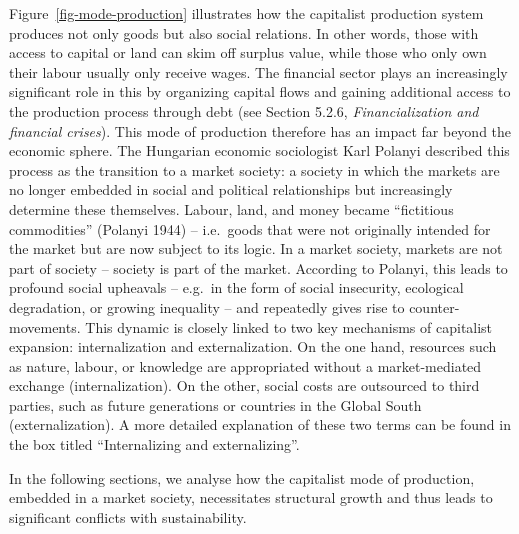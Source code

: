 \documentclass[
  a4paper,
  DIV=11,
  numbers=noendperiod,
  oneside,
  openany]{scrreprt}
\begin{document}
Figure~\ref{fig-mode-production} illustrates how the capitalist
production system produces not only goods but also social relations. In
other words, those with access to capital or land can skim off surplus
value, while those who only own their labour usually only receive wages.
The financial sector plays an increasingly significant role in this by
organizing capital flows and gaining additional access to the production
process through debt (see Section 5.2.6, \emph{Financialization and
financial crises}). This mode of production therefore has an impact far
beyond the economic sphere. The Hungarian economic sociologist Karl
Polanyi described this process as the transition to a market society: a
society in which the markets are no longer embedded in social and
political relationships but increasingly determine these themselves.
Labour, land, and money became ``fictitious commodities'' (Polanyi 1944)
-- i.e.~goods that were not originally intended for the market but are
now subject to its logic. In a market society, markets are not part of
society -- society is part of the market. According to Polanyi, this
leads to profound social upheavals -- e.g.~in the form of social
insecurity, ecological degradation, or growing inequality -- and
repeatedly gives rise to counter-movements. This dynamic is closely
linked to two key mechanisms of capitalist expansion: internalization
and externalization. On the one hand, resources such as nature, labour,
or knowledge are appropriated without a market-mediated exchange
(internalization). On the other, social costs are outsourced to third
parties, such as future generations or countries in the Global South
(externalization). A more detailed explanation of these two terms can be
found in the box titled ``Internalizing and externalizing''.

In the following sections, we analyse how the capitalist mode of
production, embedded in a market society, necessitates structural growth
and thus leads to significant conflicts with sustainability.
\end{document}
